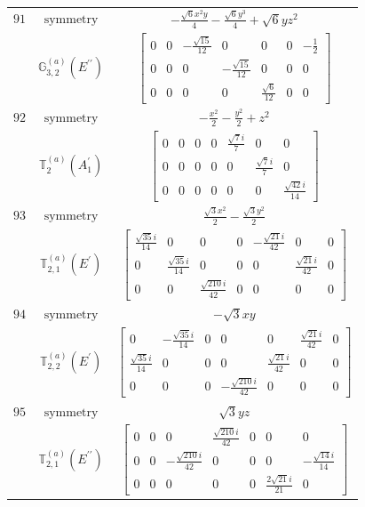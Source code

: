 \documentclass[fleqn,8pt,landscape]{jsarticle}
\begin{document}
\begin{longtable}{ccc}
$ 91 $ & $ \text{symmetry} $ & $ - \frac{\sqrt{6} x^{2} y}{4} - \frac{\sqrt{6} y^{3}}{4} + \sqrt{6} y z^{2} $ \\
$  $ & $ \mathbb{G}_{3,2}^{(a)}(E^{\prime\prime}) $ & $ \begin{bmatrix} 0 & 0 & - \frac{\sqrt{15}}{12} & 0 & 0 & 0 & - \frac{1}{2} \\ 0 & 0 & 0 & - \frac{\sqrt{15}}{12} & 0 & 0 & 0 \\ 0 & 0 & 0 & 0 & \frac{\sqrt{6}}{12} & 0 & 0 \end{bmatrix} $ \\ \hline
$ 92 $ & $ \text{symmetry} $ & $ - \frac{x^{2}}{2} - \frac{y^{2}}{2} + z^{2} $ \\
$  $ & $ \mathbb{T}_{2}^{(a)}(A_{1}^{\prime}) $ & $ \begin{bmatrix} 0 & 0 & 0 & 0 & \frac{\sqrt{7} i}{7} & 0 & 0 \\ 0 & 0 & 0 & 0 & 0 & \frac{\sqrt{7} i}{7} & 0 \\ 0 & 0 & 0 & 0 & 0 & 0 & \frac{\sqrt{42} i}{14} \end{bmatrix} $ \\ \hline
$ 93 $ & $ \text{symmetry} $ & $ \frac{\sqrt{3} x^{2}}{2} - \frac{\sqrt{3} y^{2}}{2} $ \\
$  $ & $ \mathbb{T}_{2,1}^{(a)}(E^{\prime}) $ & $ \begin{bmatrix} \frac{\sqrt{35} i}{14} & 0 & 0 & 0 & - \frac{\sqrt{21} i}{42} & 0 & 0 \\ 0 & \frac{\sqrt{35} i}{14} & 0 & 0 & 0 & \frac{\sqrt{21} i}{42} & 0 \\ 0 & 0 & \frac{\sqrt{210} i}{42} & 0 & 0 & 0 & 0 \end{bmatrix} $ \\ \hline
$ 94 $ & $ \text{symmetry} $ & $ - \sqrt{3} x y $ \\
$  $ & $ \mathbb{T}_{2,2}^{(a)}(E^{\prime}) $ & $ \begin{bmatrix} 0 & - \frac{\sqrt{35} i}{14} & 0 & 0 & 0 & \frac{\sqrt{21} i}{42} & 0 \\ \frac{\sqrt{35} i}{14} & 0 & 0 & 0 & \frac{\sqrt{21} i}{42} & 0 & 0 \\ 0 & 0 & 0 & - \frac{\sqrt{210} i}{42} & 0 & 0 & 0 \end{bmatrix} $ \\ \hline
$ 95 $ & $ \text{symmetry} $ & $ \sqrt{3} y z $ \\
$  $ & $ \mathbb{T}_{2,1}^{(a)}(E^{\prime\prime}) $ & $ \begin{bmatrix} 0 & 0 & 0 & \frac{\sqrt{210} i}{42} & 0 & 0 & 0 \\ 0 & 0 & - \frac{\sqrt{210} i}{42} & 0 & 0 & 0 & - \frac{\sqrt{14} i}{14} \\ 0 & 0 & 0 & 0 & 0 & \frac{2 \sqrt{21} i}{21} & 0 \end{bmatrix} $ \\ \hline

\end{longtable}
\end{document}
